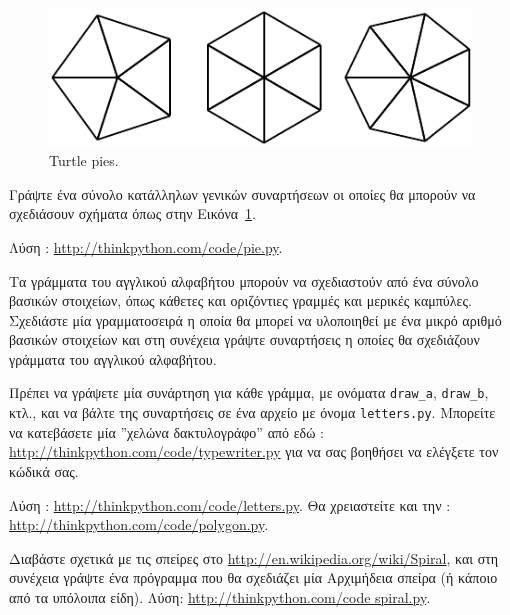 \documentclass[10pt]{book}
\begin{document}
\begin{figure}
\centerline
{\includegraphics[scale=0.8]{figs/pies.pdf}}
\caption{Turtle pies.}
\label{fig.pies}
\end{figure}


\begin{exercise}

Γράψτε ένα σύνολο κατάλληλων γενικών συναρτήσεων οι οποίες θα μπορούν να σχεδιάσουν σχήματα όπως στην Εικόνα~\ref{fig.pies}.

Λύση : \url{http://thinkpython.com/code/pie.py}.
\\
\end{exercise}

\begin{exercise}

Τα γράμματα του αγγλικού αλφαβήτου μπορούν να σχεδιαστούν από ένα σύνολο βασικών στοιχείων,
όπως κάθετες και οριζόντιες γραμμές και μερικές καμπύλες. Σχεδιάστε μία γραμματοσειρά η οποία θα 
μπορεί να υλοποιηθεί με ένα μικρό αριθμό βασικών στοιχείων και στη συνέχεια γράψτε συναρτήσεις
η οποίες θα σχεδιάζουν γράμματα του αγγλικού αλφαβήτου.

Πρέπει να γράψετε μία συνάρτηση για κάθε γράμμα, με ονόματα  \verb"draw_a", \verb"draw_b",  κτλ.,
και να βάλτε της συναρτήσεις σε ένα αρχείο με όνομα {\tt letters.py}.  Μπορείτε να κατεβάσετε μία
''χελώνα δακτυλογράφο'' από εδώ  : \url{http://thinkpython.com/code/typewriter.py}  για να σας
βοηθήσει να ελέγξετε τον κώδικά σας.

Λύση : \url{http://thinkpython.com/code/letters.py}. Θα χρειαστείτε και την :
\url{http://thinkpython.com/code/polygon.py}.
\\
\end{exercise}


\begin{exercise}

Διαβάστε σχετικά με τις σπείρες στο  \url{http://en.wikipedia.org/wiki/Spiral},  και στη συνέχεια γράψτε ένα πρόγραμμα που θα σχεδιάζει μία Αρχιμήδεια σπείρα (ή κάποιο από τα υπόλοιπα είδη). Λύση: \url{http://thinkpython.com/code spiral.py}.

\end{exercise}
\end{document}
